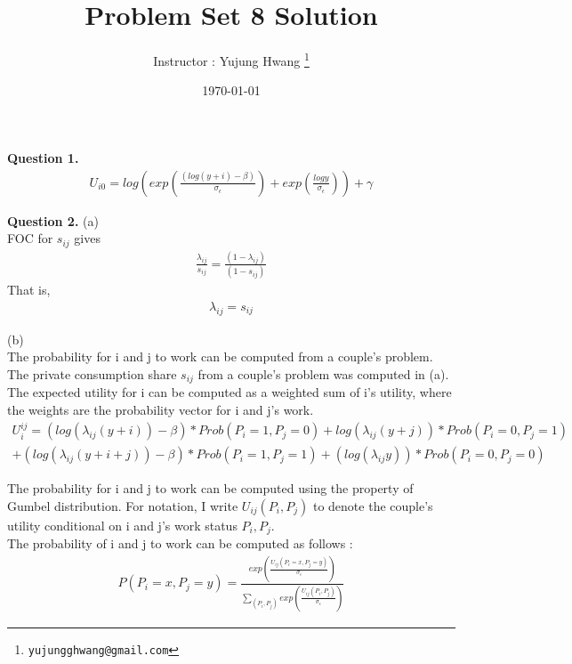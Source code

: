 \documentclass[paper=a4, fontsize=13pt]{extarticle} %
\numberwithin{equation}{section} %
\numberwithin{figure}{section} %
\numberwithin{table}{section} %
\begin{document}
\title{	
\normalfont \normalsize 
\huge Problem Set 8 Solution
}
\author{
Instructor : Yujung Hwang \thanks{\texttt{yujungghwang@gmail.com}}} %
\date{\today} %
\maketitle %

\textbf{Question 1.} 
\begin{gather}
U_{i0} = log\left(  exp\left( \frac{(log (y + i) - \beta)}{\sigma_{\epsilon} } \right) + exp\left(  \frac{log y}{\sigma_{\epsilon} }\right)  \right) + \gamma
\end{gather}

\textbf{Question 2.} 
(a)  \\
FOC for $s_{ij}$ gives
\begin{gather}
\frac{\lambda_{ij}}{s_{ij}} = \frac{(1-\lambda_{ij})}{(1-s_{ij})} 
\end{gather}
That is,
\begin{gather}
\lambda_{ij} = s_{ij}
\end{gather}

(b) \\
The probability for i and j to work can be computed from a couple's problem. The private consumption share $s_{ij}$ from a couple's problem was computed in (a).\\
The expected utility for i can be computed as a weighted sum of i's utility, where the weights are the probability vector for i and j's work.\\
\begin{gather}
U_{i}^{ij} = (log ( \lambda_{ij}(y+ i)) - \beta )*Prob(P_i=1,P_j=0) + log ( \lambda_{ij}(y+ j))*Prob(P_i=0,P_j=1)  \\
+  (log(\lambda_{ij}(y+ i + j)) - \beta)*Prob(P_i=1,P_j=1) + (log ( \lambda_{ij} y))*Prob(P_i=0, P_j =0)  
\end{gather}

The probability for i and j to work can be computed using the property of Gumbel distribution. 
For notation, I write $U_{ij}(P_i,P_j)$ to denote the couple's utility conditional on i and j's work status $P_i, P_j$.\\
The probability of i and j to work can be computed as follows : \\
\begin{gather}
	P(P_i=x,P_j=y) = \frac{exp \left( \frac{ U_{ij} (P_i=x,P_j=y) }{\sigma_{\epsilon}} \right)  }{  \sum_{(P_i,P_j)} exp\left( \frac{U_{ij}(P_i,P_j) }{\sigma_{\epsilon} } \right) }
\end{gather}
\end{document}
